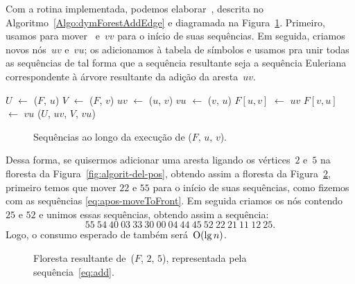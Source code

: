 Com a rotina \ETmovetofront{} implementada, podemos elaborar~\dymForestAddEdge{}, descrita no Algoritmo~\ref{Algo:dymForestAddEdge} e diagramada na Figura~\ref{fig:algorit-add-sequencias}.
Primeiro, usamos \ETmovetofront{} para mover~ e~$vv$ para o início de suas sequências.
Em seguida, criamos novos nós~$uv$ e~$vu$; os adicionamos à tabela de símbolos e usamos \treapJoin{} pra unir todas as sequências de tal forma que a sequência resultante seja a sequência Euleriana correspondente à árvore resultante da adição da aresta~$uv$.


\begin{algorithm}[h]
\caption{\dymForestAddEdge($F$, $u$, $v$)}
\label{Algo:dymForestAddEdge}
\begin{algorithmic}[1]
\State $U$ $\gets$ \ETmovetofront($F$, $u$)
\State $V$ $\gets$ \ETmovetofront($F$, $v$)
\State $uv$ $\gets$ \treapCreate($u$, $v$)
\State $vu$ $\gets$ \treapCreate($v$, $u$)
\State $F[u,v]$ $\gets$ $uv$
\State $F[v,u]$ $\gets$ $vu$
\State \treapJoin($U$, $uv$, $V$, $vu$)
\end{algorithmic}
\end{algorithm}


\begin{figure}[H]
\centering

\caption{Sequências ao longo da execução de \dymForestAddEdge($F$, $u$, $v$).}
\label{fig:algorit-add-sequencias}
\end{figure}

Dessa forma, se quisermos adicionar uma aresta ligando os vértices~$2$ e~$5$ na floresta da Figura~\ref{fig:algorit-del-pos}, obtendo assim a floresta da Figura~\ref{fig:algorit-add-pos}, primeiro temos que mover $22$ e $55$ para o início de suas sequências, como fizemos com as sequências \eqref{eq:apos-moveToFront}. Em seguida criamos os nós contendo $25$ e $52$ e unimos essas sequências, obtendo assim a sequência:
\begin{equation}
55~54~40~03~33~30~00~04~44~45~52~22~21~11~12~25.\label{eq:add}
\end{equation}
Logo, o consumo esperado de \dymForestAddEdge{} também será~$\mathrm{O}(\lg n)$.

\begin{figure}[htb]
\centering

\caption{Floresta resultante de~\dymForestAddEdge($F$, $2$, $5$), representada pela sequência~\eqref{eq:add}.}
\label{fig:algorit-add-pos}
\end{figure}
